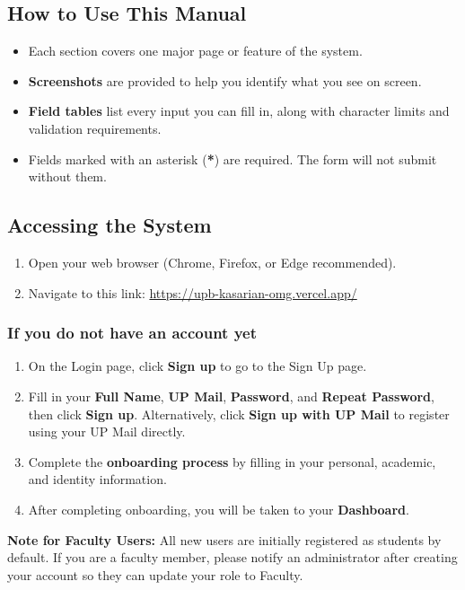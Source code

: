 \documentclass[12pt, a4paper]{article}
\begin{document}
\subsection{How to Use This Manual}
\begin{itemize}[leftmargin=1.5em]
  \item Each section covers one major page or feature of the system.
  \item \textbf{Screenshots} are provided to help you identify what you see on screen.
  \item \textbf{Field tables} list every input you can fill in, along with character limits and validation requirements.
  \item Fields marked with an asterisk (\textbf{*}) are required. The form will not submit without them.
\end{itemize}

\subsection{Accessing the System}
\begin{enumerate}[leftmargin=1.5em]
  \item Open your web browser (Chrome, Firefox, or Edge recommended).
  \item Navigate to this link: \url{https://upb-kasarian-omg.vercel.app/}
\end{enumerate}

\subsubsection*{If you do not have an account yet}
\begin{enumerate}[leftmargin=1.5em]
  \item On the Login page, click \textbf{Sign up} to go to the Sign Up page.
  \item Fill in your \textbf{Full Name}, \textbf{UP Mail}, \textbf{Password}, and \textbf{Repeat Password}, then click \textbf{Sign up}. Alternatively, click \textbf{Sign up with UP Mail} to register using your UP Mail directly.
  \item Complete the \textbf{onboarding process} by filling in your personal, academic, and identity information.
  \item After completing onboarding, you will be taken to your \textbf{Dashboard}.
\end{enumerate}

\textbf{Note for Faculty Users:} All new users are initially registered as students by default. If you are a faculty member, please notify an administrator after creating your account so they can update your role to Faculty.
\end{document}

